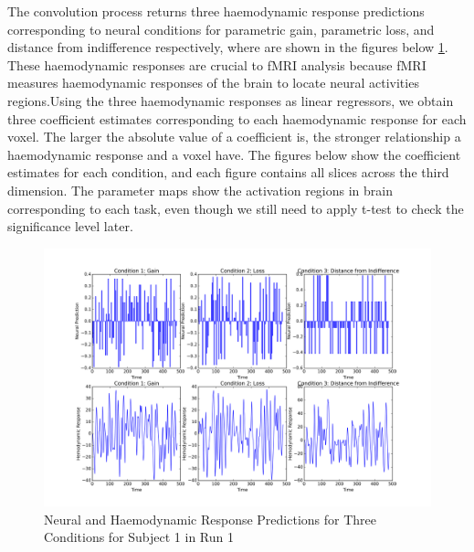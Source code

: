 \par \indent The convolution process returns three haemodynamic response predictions corresponding to neural conditions for parametric gain, parametric loss, and distance from indifference respectively, where are shown in the figures below \ref{fig:convolution}. These haemodynamic responses are crucial to fMRI analysis because fMRI measures haemodynamic responses of the brain to locate neural activities regions.Using the three haemodynamic responses as linear regressors, we obtain three coefficient estimates corresponding to each haemodynamic response for each voxel. The larger the absolute value of a coefficient is, the stronger relationship a haemodynamic response and a voxel have. The figures below show the coefficient estimates for each condition, and each figure contains all slices across the third dimension. The parameter maps show the activation regions in brain corresponding to each task, even though we still need to apply t-test to check the significance level later. 

\begin{figure}[h!]
\centering
\includegraphics[width=120mm]{images/convolution3cond.png}
\caption{Neural and Haemodynamic Response Predictions for Three Conditions for Subject 1 in Run 1}
\label{fig:convolution}
\end{figure}